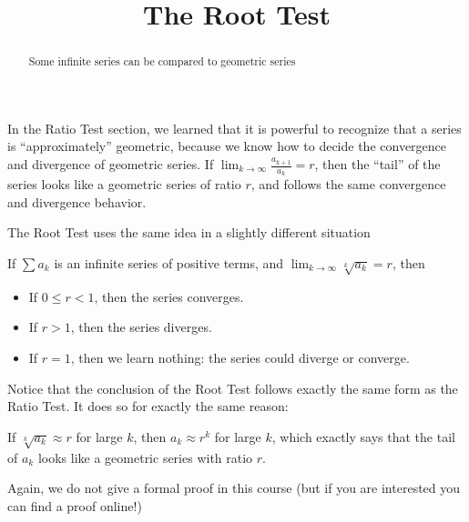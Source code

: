 \documentclass{ximera}
\title[Dig-In:]{The Root Test}
\begin{document}
\begin{abstract}
Some infinite series can be compared to geometric series
\end{abstract}
\maketitle

In the Ratio Test section, we learned that it is powerful to recognize that a series is ``approximately'' geometric, because we know how to decide the convergence and divergence of geometric series.  If $\lim_{k \to \infty} \frac{a_{k+1}}{a_k} = r$, then the ``tail'' of the series looks like a geometric series of ratio $r$, and follows the same convergence and divergence behavior.

The Root Test uses the same idea in a slightly different situation

\begin{theorem}
	If $\sum a_k$ is an infinite series of positive terms, and $\lim_{k \to \infty} \sqrt[k]{a_k} = r$, then 
	
	\begin{itemize}
		\item If $0 \leq r < 1$, then the series converges.
		\item If $r>1$, then the series diverges.
		\item If $r = 1$, then we learn nothing:  the series could diverge or converge.
	\end{itemize}
\end{theorem}

Notice that the conclusion of the Root Test follows exactly the same form as the Ratio Test.  It does so for exactly the same reason:

If $\sqrt[k]{a_k} \approx r$ for large $k$, then $a_k \approx r^k$ for large $k$, which exactly says that the tail of $a_k$ looks like a geometric series with ratio $r$.

Again, we do not give a formal proof in this course (but if you are interested you can find a proof online!)
\end{document}
